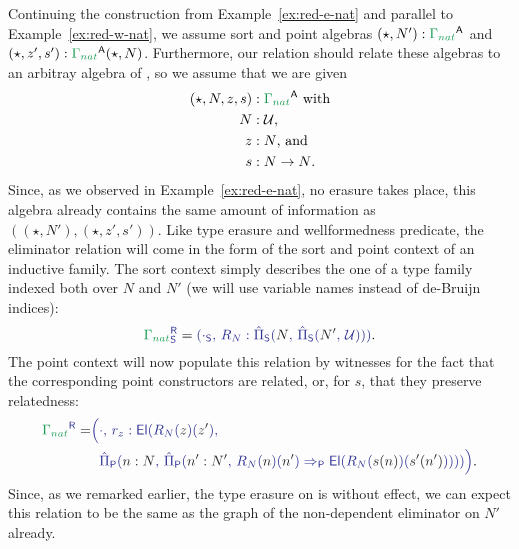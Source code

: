 \begin{example}
Continuing the construction from Example~\ref{ex:red-e-nat} and parallel to 
Example~\ref{ex:red-w-nat}, we assume sort and point algebras
$(\star,N') : \grm{\Gamma_{nat}}^\CC $ and $(\star,z',s') : \grm{\Gamma_{nat}}^\CC(\star, N)$.
Furthermore, our relation should relate these algebras to an arbitray algebra
of , so we assume that we are given
\begin{align*}
(\star, N, z, s) &: \grm{\Gamma_{nat}}^\CC \text{ with} \\ %
N &: \UU \text{,}\\
z &: N \text{, and} \\
s &: N \to N \text{.}
\end{align*}
Since, as we observed in Example~\ref{ex:red-e-nat}, no erasure takes place, this
algebra already contains the same amount of information as $((\star, N'), (\star, z', s'))$.
Like type erasure and wellformedness predicate, the eliminator relation will come
in the form of the sort and point context of an inductive family.
The sort context simply describes the one of a type family indexed both over $N$
and $N'$ (we will use variable names instead of de-Bruijn indices):
\begin{equation*}
\tqm{\grm{\Gamma_{nat}}^\RR_\Sc}
  = \tqm{(\cdot_\Sc ,\, R_N : \ExtPiS{N}{\ExtPiS{N'}{\UU}})} \text{.}
\end{equation*}
The point context will now populate this relation by witnesses for the fact
that the corresponding point constructors are related, or, for $s$, that they
preserve relatedness:
\begin{align*}
\tqm{\grm{\Gamma_{nat}}^\RR}
  =& \tqm{\Bigl(\cdot ,\, r_z : \El(R_N(\blm{z})(\blm{z'}) ,\, } \\
   & \tqm{ \phantom{\Bigl(}
    \ExtPiP{n : N}{\ExtPiP{n' : N'}{R_N(\blm{n})(\blm{n'}) \Rightarrow_\Pc
      \El(R_N(\blm{s(n)})(\blm{s'(n')}))}} \Bigr)} \text{.}
\end{align*}
Since, as we remarked earlier, the type erasure on  is without
effect, we can expect this relation to be the same as the graph of the
non-dependent eliminator on $N'$ already.
\end{example}

